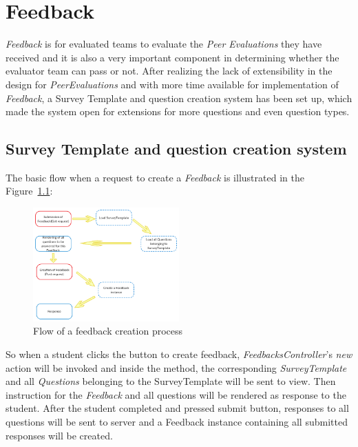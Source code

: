 \chapter{Feedback}

\textit{Feedback} is for evaluated teams to evaluate the \textit{Peer Evaluations} they have received and it is also a very important component in determining whether the evaluator team can pass or not. After realizing the lack of extensibility in the design for \textit{PeerEvaluations} and with more time available for implementation of \textit{Feedback}, a Survey Template and question creation system has been set up, which made the system open for extensions for more questions and even question types.

\section{Survey Template and question creation system}

The basic flow when a request to create a \textit{Feedback} is illustrated in the Figure~\ref{fig:FeedbackFlow}:

\begin{figure}[h]
  \centering
  \includegraphics[width=0.5\textwidth]{Images/Skylab_Feedback_Flow.png}
  \caption{Flow of a feedback creation process}
  \label{fig:FeedbackFlow}
\end{figure}

So when a student clicks the button to create feedback, \textit{FeedbacksController}'s \textit{new} action will be invoked and inside the method, the corresponding \textit{SurveyTemplate} and all \textit{Questions} belonging to the SurveyTemplate will be sent to view. Then instruction for the \textit{Feedback} and all questions will be rendered as response to the student. After the student completed and pressed submit button, responses to all questions will be sent to server and a Feedback instance containing all submitted responses will be created.

